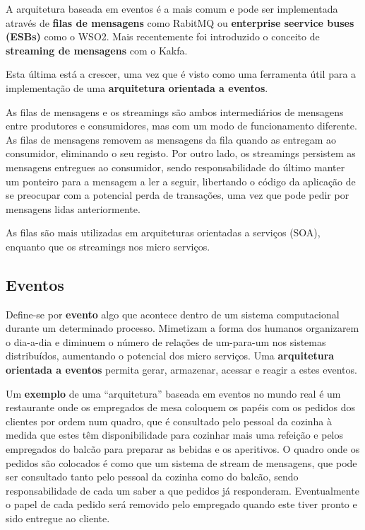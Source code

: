 \documentclass{article}
\begin{document}
\vspace{2mm}

A arquitetura baseada em eventos é a mais comum e pode ser implementada através de \textbf{filas
de mensagens} como RabitMQ ou \textbf{enterprise seervice buses (ESBs)} como o WSO2. Mais
recentemente foi introduzido o conceito de \textbf{streaming de mensagens} com o Kakfa.

Esta última está a crescer, uma vez que é visto como
uma ferramenta útil para a implementação de uma
\textbf{arquitetura orientada a eventos}.

As filas de mensagens e os streamings são ambos intermediários de mensagens entre produtores e consumidores, mas
com um modo de funcionamento diferente. As filas de mensagens removem as mensagens da fila quando as entregam
ao consumidor, eliminando o seu registo. Por outro lado, os streamings persistem as mensagens entregues ao
consumidor, sendo responsabilidade do último manter um ponteiro para a mensagem a ler a seguir, libertando o código
da aplicação de se preocupar com a potencial perda de transações, uma vez que pode pedir por mensagens lidas
anteriormente.

As filas são mais utilizadas em arquiteturas orientadas a serviços (SOA), enquanto que os streamings nos micro
serviços.

\subsection{Eventos}

Define-se por \textbf{evento} algo que acontece dentro de um sistema computacional durante um
determinado processo. Mimetizam a forma dos humanos organizarem o dia-a-dia e diminuem o
número de relações de um-para-um nos sistemas distribuídos, aumentando o potencial dos
micro serviços.
Uma \textbf{arquitetura orientada a eventos} permita gerar, armazenar,
acessar e reagir a estes eventos.

\vspace{2mm}

Um \textbf{exemplo} de uma “arquitetura” baseada em eventos no mundo real é um restaurante onde os empregados de mesa
coloquem os papéis com os pedidos dos clientes por ordem num quadro, que é consultado pelo pessoal da cozinha à
medida que estes têm disponibilidade para cozinhar mais uma refeição e pelos empregados do balcão para preparar
as bebidas e os aperitivos. O quadro onde os pedidos são colocados é como que um sistema de stream de
mensagens, que pode ser consultado tanto pelo pessoal da cozinha como do balcão, sendo responsabilidade de cada
um saber a que pedidos já responderam. Eventualmente o papel de cada pedido será removido pelo empregado
quando este tiver pronto e sido entregue ao cliente.
\end{document}
